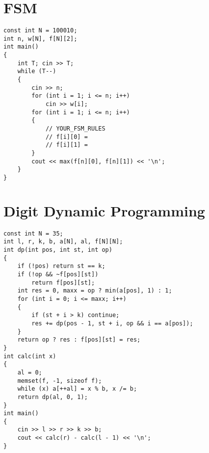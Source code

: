 \section{FSM}
\begin{lstlisting}
const int N = 100010;
int n, w[N], f[N][2];
int main()
{
    int T; cin >> T;
    while (T--)
    {
        cin >> n;
        for (int i = 1; i <= n; i++)
            cin >> w[i];
        for (int i = 1; i <= n; i++)
        {
            // YOUR_FSM_RULES
            // f[i][0] =
            // f[i][1] =
        }
        cout << max(f[n][0], f[n][1]) << '\n';
    }
}
\end{lstlisting}
\section{Digit Dynamic Programming}
\begin{lstlisting}
const int N = 35;
int l, r, k, b, a[N], al, f[N][N];
int dp(int pos, int st, int op)
{
    if (!pos) return st == k;
    if (!op && ~f[pos][st])
        return f[pos][st];
    int res = 0, maxx = op ? min(a[pos], 1) : 1;
    for (int i = 0; i <= maxx; i++)
    {
        if (st + i > k) continue;
        res += dp(pos - 1, st + i, op && i == a[pos]);
    }
    return op ? res : f[pos][st] = res;
}
int calc(int x)
{
    al = 0;
    memset(f, -1, sizeof f);
    while (x) a[++al] = x % b, x /= b;
    return dp(al, 0, 1);
}
int main()
{
    cin >> l >> r >> k >> b;
    cout << calc(r) - calc(l - 1) << '\n';
}
\end{lstlisting}
